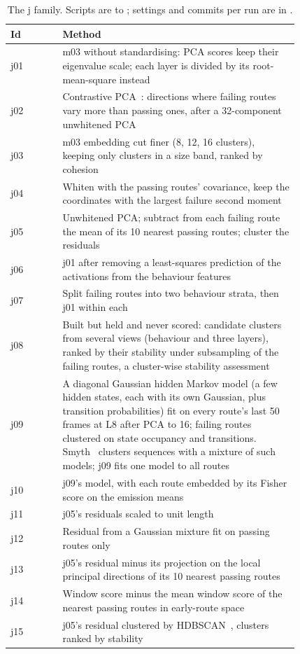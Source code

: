 \begin{table}[t]
\centering
\small
\begin{tabular}{@{}lp{0.82\linewidth}@{}}
\toprule
Id & Method \\
\midrule
j01 & m03 without standardising: PCA scores keep their eigenvalue scale; each
      layer is divided by its root-mean-square instead \\
j02 & Contrastive PCA~\cite{abid2018cpca}: directions where failing routes vary
      more than passing ones, after a 32-component unwhitened PCA \\
j03 & m03 embedding cut finer (8, 12, 16 clusters), keeping only clusters in a
      size band, ranked by cohesion \\
j04 & Whiten with the passing routes' covariance, keep the coordinates with the
      largest failure second moment \\
j05 & Unwhitened PCA; subtract from each failing route the mean of its 10
      nearest passing routes; cluster the residuals \\
j06 & j01 after removing a least-squares prediction of the activations from the
      behaviour features \\
j07 & Split failing routes into two behaviour strata, then j01 within each \\
j08 & Built but held and never scored: candidate clusters from several views (behaviour and three layers), ranked
      by their stability under subsampling of the failing routes, a cluster-wise
      stability assessment~\cite{hennig2007stability} \\
j09 & A diagonal Gaussian hidden Markov model (a few hidden states, each with its
      own Gaussian, plus transition probabilities) fit on every route's last 50
      frames at L8 after PCA to 16; failing routes clustered on state occupancy
      and transitions. Smyth~\cite{smyth1996hmm} clusters sequences with a
      mixture of such models; j09 fits one model to all routes \\
j10 & j09's model, with each route embedded by its Fisher score on the emission
      means \\
j11 & j05's residuals scaled to unit length \\
j12 & Residual from a Gaussian mixture fit on passing routes only \\
j13 & j05's residual minus its projection on the local principal directions of
      its 10 nearest passing routes \\
j14 & Window score minus the mean window score of the nearest passing routes in
      early-route space \\
j15 & j05's residual clustered by HDBSCAN~\cite{campello2013hdbscan,mcinnes2017hdbscan},
      clusters ranked by stability \\
\bottomrule
\end{tabular}
\caption{The j family. Scripts are  to ;
settings and commits per run are in .}
\label{tab:jfamily}
\end{table}

